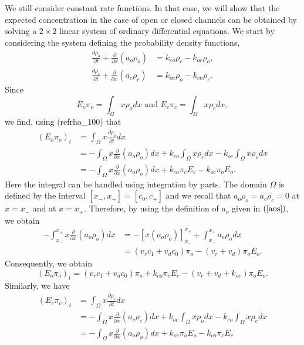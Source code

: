 We still consider constant rate functions. In that case, we will show that
the expected concentration in the case of open or closed channels can be obtained by 
solving a  $2\times2$ linear system of ordinary differential equations. We start by considering the system
defining the probability density functions,
\begin{align}
\frac{\partial\rho_{o}}{\partial t}+\frac{\partial}{\partial x}\left(
a_{o}\rho_{o}\right)   &  =k_{co}\rho_{c}-k_{oc}\rho_{o},\label{rho_100}\\
\frac{\partial\rho_{c}}{\partial t}+\frac{\partial}{\partial x}\left(
a_{c}\rho_{c}\right)   &  =k_{oc}\rho_{o}-k_{co}\rho_{c}.\label{rho_101}
\end{align}
Since
\begin{equation}
E_{o}\pi_{o}=\int_{\Omega}x\rho_{o}dx\text{ and }E_{c}\pi_{c}=\int_{\Omega
}x\rho_{c}dx,
\end{equation}
we find, using (ref{rho_100}) that
\begin{align}
\left(  E_{o}\pi_{o}\right)  _{t}  & =\int_{\Omega}x\frac{\partial\rho_{o}
}{\partial t}dx\\
& =-\int_{\Omega}x\frac{\partial}{\partial x}\left(  a_{o}\rho_{o}\right)
dx+k_{co}\int_{\Omega}x\rho_{c}dx-k_{oc}\int_{\Omega}x\rho_{o}dx\\
& =-\int_{\Omega}x\frac{\partial}{\partial x}\left(  a_{o}\rho_{o}\right)
dx+k_{co}\pi_{c}E_{c}-k_{oc}\pi_{o}E_{o}.
\end{align}
Here the integral can be handled using integration by parts. The domain
$\Omega$ is defined by the interval $\left[  x_{-},x_{+}\right] =[c_0,c_+] $ and we
recall that $a_{o}\rho_{o}=a_{c}\rho_{c}=0$ at $x=x_{-}$ and at $x=x_{+}.$
Therefore, by using the definition of $a_{o}$ given in $\left(  \ref{aos}\right)
$, we obtain
\begin{align}
-\int_{x_{-}}^{x_{+}}x\frac{\partial}{\partial x}\left(  a_{o}\rho_{o}\right)
dx &  =-\left[  x\left(  a_{o}\rho_{o}\right)  \right]  _{x_{-}}^{x_{+}}
+\int_{x_{-}}^{x_{+}}a_{o}\rho_{o}dx\\
&  =\left(  v_{r}c_{1}+v_{d}c_{0}\right)  \pi_{o}-\left(  v_{r}+v_{d}\right)
\pi_{o}E_{o}.
\end{align}
Consequently, we obtain
\begin{equation}
\left(  E_{o}\pi_{o}\right)  _{t}=\left(  v_{r}c_{1}+v_{d}c_{0}\right)
\pi_{o}+k_{co}\pi_{c}E_{c}-\left(  v_{r}+v_{d}+k_{oc}\right)  \pi_{o}E_{o}.
\end{equation}
Similarly, we have
\begin{align}
\left(  E_{c}\pi_{c}\right)  _{t}  & =\int_{\Omega}x\frac{\partial\rho_{c}
}{\partial t}dx\\
& =-\int_{\Omega}x\frac{\partial}{\partial x}\left(  a_{c}\rho_{c}\right)
dx+k_{oc}\int_{\Omega}x\rho_{o}dx-k_{co}\int_{\Omega}x\rho_{c}dx\\
& =-\int_{\Omega}x\frac{\partial}{\partial x}\left(  a_{o}\rho_{o}\right)
dx+k_{oc}\pi_{o}E_{o}-k_{co}\pi_{c}E_{c}
\end{align}
